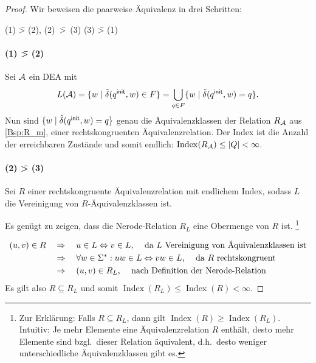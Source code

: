 \begin{proof}
  Wir beweisen die paarweise Äquivalenz in drei Schritten:

  \begin{center}
    (1) \=> (2), \quad \mbox{(2) \=> (3)}\quad {} \quad (3) \=> (1)
  \end{center}

        \paragraph{(1) \=> (2)} Sei $\mathcal{A}$ ein \ac{DEA} mit
  \begin{displaymath}
    L(\mathcal{A})=\{w \mid \tilde\delta(q^\mathsf{init},w)\in F \} = \bigcup_{q \in F} \{ w \mid \tilde\delta(q^\mathsf{init},w) = q\}.
\end{displaymath}
%
Nun sind $\{ w \mid \tilde\delta(q^\mathsf{init},w)=q \}$ genau die Äquivalenzklassen der Relation $R_{\mathcal{A}}$ aus \autoref{Bsp:R_m}, einer rechtskongruenten Äquivalenzrelation.
Der Index ist die Anzahl der erreichbaren Zustände und somit endlich: $\operatorname{\operatorname{Index}}(R_{\mathcal{A}}) \le |Q| < \infty$.
        
\paragraph{(2) \=> (3)} Sei $R$ einer rechtskongruente Äquivalenzrelation mit endlichem Index, sodass $L$ die Vereinigung von $R$-Äquivalenzklassen ist.
        
Es genügt zu zeigen, dass die Nerode-Relation $R_L$ eine Obermenge von $R$ ist.%
\footnote{
Zur Erklärung: Falls $R \subseteq R_L$, dann gilt $\operatorname{Index}(R) \ge \operatorname{Index}(R_L)$.
Intuitiv: Je mehr Elemente eine Äquivalenzrelation $R$ enthält, desto mehr Elemente sind bzgl.\ dieser Relation äquivalent, d.h.\ desto weniger unterschiedliche Äquivalenzklassen gibt es.
}

\begin{align*}
(u, v) \in R & \quad\Rightarrow\quad u \in L \Leftrightarrow v \in L \text{, \quad da $L$ Vereinigung von Äquivalenzklassen ist} \\
& \quad\Rightarrow\quad \forall w \in \Sigma^*: uw \in L \Leftrightarrow vw \in L \text{, \quad da $R$ rechtskongruent } \\
& \quad\Rightarrow\quad (u, v) \in R_L \text{, \quad nach Definition der Nerode-Relation}
\end{align*}
Es gilt also $R \subseteq R_L$ und somit $\operatorname{Index}(R_L) \leq \operatorname{Index}(R)<\infty$.



\end{proof}
